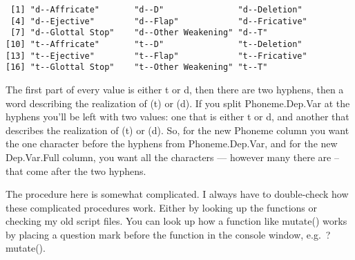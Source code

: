 \documentclass[
  12pt,
  letterpaper]{article}
\newenvironment{Shaded}{\begin{snugshade}}{\end{snugshade}}
\newcommand{\AttributeTok}[1]{\textcolor[rgb]{0.40,0.45,0.13}{#1}}
\newcommand{\CommentTok}[1]{\textcolor[rgb]{0.37,0.37,0.37}{#1}}
\newcommand{\ConstantTok}[1]{\textcolor[rgb]{0.56,0.35,0.01}{#1}}
\newcommand{\FunctionTok}[1]{\textcolor[rgb]{0.28,0.35,0.67}{#1}}
\newcommand{\NormalTok}[1]{\textcolor[rgb]{0.00,0.23,0.31}{#1}}
\newcommand{\OtherTok}[1]{\textcolor[rgb]{0.00,0.23,0.31}{#1}}
\newcommand{\SpecialCharTok}[1]{\textcolor[rgb]{0.37,0.37,0.37}{#1}}
\newcommand{\StringTok}[1]{\textcolor[rgb]{0.13,0.47,0.30}{#1}}
\renewcommand\texttt[1]{{\ttfamily\color{BrickRed}#1}}
\begin{document}
\begin{verbatim}
 [1] "d--Affricate"       "d--D"               "d--Deletion"       
 [4] "d--Ejective"        "d--Flap"            "d--Fricative"      
 [7] "d--Glottal Stop"    "d--Other Weakening" "d--T"              
[10] "t--Affricate"       "t--D"               "t--Deletion"       
[13] "t--Ejective"        "t--Flap"            "t--Fricative"      
[16] "t--Glottal Stop"    "t--Other Weakening" "t--T"              
\end{verbatim}

The first part of every value is either \texttt{t} or \texttt{d}, then
there are two hyphens, then a word describing the realization of (t) or
(d). If you split \texttt{Phoneme.Dep.Var} at the hyphens you'll be left
with two values: one that is either \texttt{t} or \texttt{d}, and
another that describes the realization of (t) or (d). So, for the new
\texttt{Phoneme} column you want the one character before the hyphens
from \texttt{Phoneme.Dep.Var}, and for the new \texttt{Dep.Var.Full}
column, you want all the characters --- however many there are -- that
come after the two hyphens.

\begin{Shaded}
\end{Shaded}

\begin{tcolorbox}[enhanced jigsaw, breakable, colframe=quarto-callout-note-color-frame, opacitybacktitle=0.6, colbacktitle=quarto-callout-note-color!10!white, leftrule=.75mm, coltitle=black, bottomrule=.15mm, bottomtitle=1mm, toprule=.15mm, left=2mm, title=\textcolor{quarto-callout-note-color}{\faInfo}\hspace{0.5em}{Note}, toptitle=1mm, opacityback=0, titlerule=0mm, arc=.35mm, rightrule=.15mm, colback=white]
The procedure here is somewhat complicated. I always have to
double-check how these complicated procedures work. Either by looking up
the functions or checking my old script files. You can look up how a
function like \texttt{mutate()} works by placing a question mark before
the function in the console window, e.g.~\texttt{?mutate()}.
\end{tcolorbox}
\end{document}
